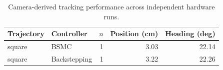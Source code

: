 \begin{table}[!t]
\centering
\caption{Camera-derived tracking performance across independent hardware runs.}
\label{tab:tracking}
\begin{tabular}{llrrr}
\hline
Trajectory & Controller & $n$ & Position (cm) & Heading (deg) \\
\hline
square & BSMC & 1 & 3.03 & 22.14 \\
square & Backstepping & 1 & 3.22 & 22.26 \\
\hline
\end{tabular}
\end{table}
